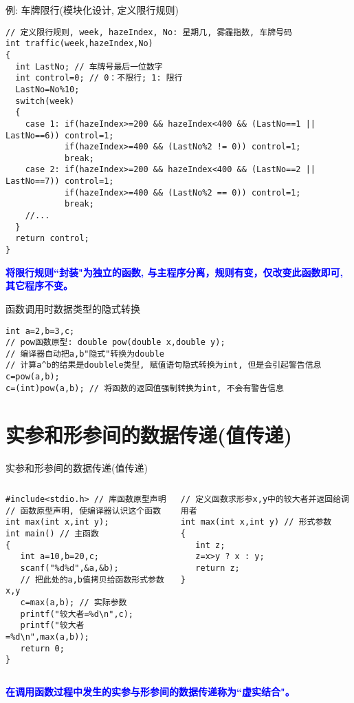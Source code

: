 \begin{frame}{例: 车牌限行(模块化设计, 定义限行规则)}
\begin{lstlisting}
// 定义限行规则, week, hazeIndex, No: 星期几, 雾霾指数, 车牌号码
int traffic(week,hazeIndex,No)
{
  int LastNo; // 车牌号最后一位数字
  int control=0; // 0：不限行; 1: 限行 
  LastNo=No%10; 
  switch(week)
  {
    case 1: if(hazeIndex>=200 && hazeIndex<400 && (LastNo==1 || LastNo==6)) control=1;
            if(hazeIndex>=400 && (LastNo%2 != 0)) control=1;  
            break; 
    case 2: if(hazeIndex>=200 && hazeIndex<400 && (LastNo==2 || LastNo==7)) control=1;
            if(hazeIndex>=400 && (LastNo%2 == 0)) control=1; 
            break;
    //...
  }
  return control;
} 
\end{lstlisting}
\textbf{\textcolor{blue}{将限行规则``封装"为独立的函数, 与主程序分离，规则有变，仅改变此函数即可, 其它程序不变。}}
\end{frame}

\begin{frame}{函数调用时数据类型的隐式转换}
\begin{lstlisting}
int a=2,b=3,c;
// pow函数原型: double pow(double x,double y);
// 编译器自动把a,b"隐式"转换为double
// 计算a^b的结果是doublele类型, 赋值语句隐式转换为int, 但是会引起警告信息
c=pow(a,b);
c=(int)pow(a,b); // 将函数的返回值强制转换为int, 不会有警告信息
\end{lstlisting}
\end{frame}

\section{实参和形参间的数据传递(值传递)}

\begin{frame}{实参和形参间的数据传递(值传递)}
\begin{columns}[T]
\begin{lstlisting}
#include<stdio.h> // 库函数原型声明
// 函数原型声明, 使编译器认识这个函数
int max(int x,int y); 
int main() // 主函数
{
   int a=10,b=20,c;
   scanf("%d%d",&a,&b);
   // 把此处的a,b值拷贝给函数形式参数x,y
   c=max(a,b); // 实际参数 
   printf("较大者=%d\n",c);
   printf("较大者=%d\n",max(a,b));
   return 0; 
}
\end{lstlisting}
\begin{lstlisting}
// 定义函数求形参x,y中的较大者并返回给调用者
int max(int x,int y) // 形式参数
{  
   int z;
   z=x>y ? x : y;
   return z; 
}
\end{lstlisting}
\end{columns}
\textbf{\textcolor{blue}{在调用函数过程中发生的实参与形参间的数据传递称为``虚实结合"。}}
\end{frame}

